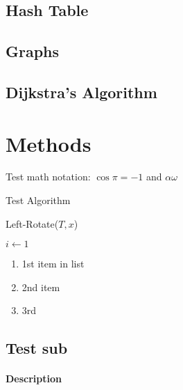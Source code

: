\documentclass[10pt, 
a4paper, 
oneside, 
headinclude, footinclude, 
BCOR5mm]
{scrartcl}
\begin{document}
\subsection{Hash Table}

\newpage

\subsection{Graphs}


\newpage

\subsection{Dijkstra's Algorithm}
\section{Methods}

Test math notation: $\cos\pi=-1$ and $\alpha\omega$

Test Algorithm
\IncMargin{1em}
\begin{algorithm}
    \caption{Left-Rotate($T,x$)}
    \BlankLine

    $i \gets 1$\;

\end{algorithm}\DecMargin{1em}


\begin{enumerate}
    \item 1st item in list
    \item 2nd item 
    \item 3rd
\end{enumerate}

\subsection{Test sub}

\paragraph{Description}
\end{document}
